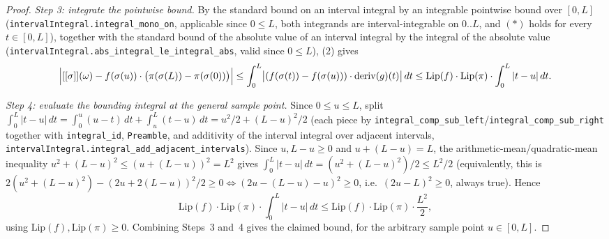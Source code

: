 \begin{proof}
  \emph{Step 3: integrate the pointwise bound.} By the standard bound on an interval integral by an
  integrable pointwise bound over $[0,L]$ (\texttt{intervalIntegral.integral\_mono\_on}, applicable
  since $0 \le L$, both integrands are interval-integrable on $0..L$, and $(\ast)$ holds for every
  $t \in [0,L]$), together with the standard bound of the absolute value of an interval integral by
  the integral of the absolute value (\texttt{intervalIntegral.abs\_integral\_le\_integral\_abs}, valid
  since $0 \le L$), (2) gives
  \[
    \Bigl|[[\sigma]](\omega) - f(\sigma(u)) \cdot \bigl(\pi(\sigma(L)) - \pi(\sigma(0))\bigr)\Bigr|
    \le \int_0^L \bigl|(f(\sigma(t)) - f(\sigma(u))) \cdot \mathrm{deriv}(g)(t)\bigr|\,dt
    \le \mathrm{Lip}(f) \cdot \mathrm{Lip}(\pi) \cdot \int_0^L |t-u| \, dt
    .
  \]

  \emph{Step 4: evaluate the bounding integral at the general sample point.} Since $0 \le u \le L$,
  split $\int_0^L |t-u|\,dt = \int_0^u (u-t)\,dt + \int_u^L (t-u)\,dt = u^2/2 + (L-u)^2/2$ (each piece
  by \texttt{integral\_comp\_sub\_left}/\texttt{integral\_comp\_sub\_right} together with
  \texttt{integral\_id}, \texttt{Preamble}, and additivity of the interval integral over adjacent
  intervals, \texttt{intervalIntegral.integral\_add\_adjacent\_intervals}). Since $u,L-u \ge 0$ and
  $u+(L-u)=L$, the arithmetic-mean/quadratic-mean inequality $u^2+(L-u)^2 \le (u+(L-u))^2 = L^2$ gives
  $\int_0^L|t-u|\,dt = (u^2+(L-u)^2)/2 \le L^2/2$ (equivalently, this is
  $2(u^2+(L-u)^2)-(2u+2(L-u))^2/2 \ge 0 \iff (2u-(L-u)-u)^2\ge0$, i.e.\ $(2u-L)^2\ge 0$, always true).
  Hence
  \[
    \mathrm{Lip}(f) \cdot \mathrm{Lip}(\pi) \cdot \int_0^L |t-u|\,dt
    \le \mathrm{Lip}(f) \cdot \mathrm{Lip}(\pi) \cdot \frac{L^2}{2}
    ,
  \]
  using $\mathrm{Lip}(f),\mathrm{Lip}(\pi)\ge 0$. Combining Steps~3 and~4 gives the claimed bound,
  for the arbitrary sample point $u \in [0,L]$.
\end{proof}
